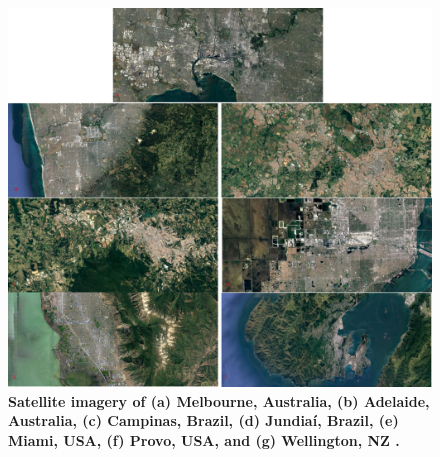 \documentclass[10pt,letterpaper]{article}
\begin{document}
\begin{figure}[!htbp]
\centering    
\includegraphics[scale=0.35]{Images/PlosOne/Fig14.png} 
 \caption{\bf Satellite imagery of (a) Melbourne, Australia, (b) Adelaide, Australia, (c) Campinas, Brazil, (d) Jundia\'{i}, Brazil, (e) Miami, USA, (f) Provo, USA, and (g) Wellington, NZ \cite{GoogleStatic2017}.}    
 \label{fig:satimages}  
\end{figure} 
\end{document}
